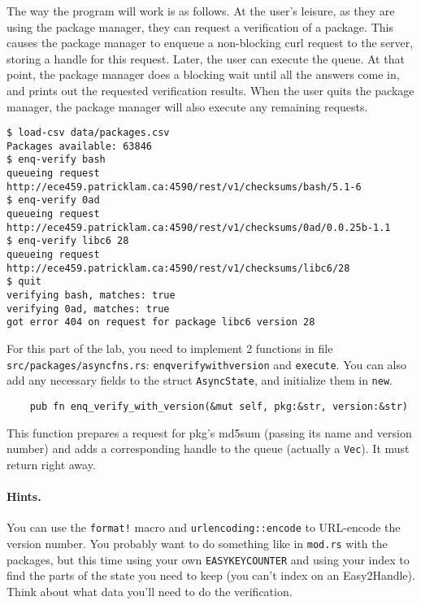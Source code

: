\documentclass[12pt]{article}
\renewcommand{\_}{\kern-1.5pt\textunderscore\kern-1.5pt}
\begin{document}
\vspace{1em}
The way the program will work is as follows. At the user's leisure, as they are using the package manager, they can request a verification of a package. This causes the package manager to enqueue a non-blocking curl request to the server, storing a handle for this request. Later, the user can execute the queue. At that point, the package manager does a blocking wait until all the answers come in, and prints out the requested verification results. When the user quits the package manager, the package manager will also execute any remaining requests.\par

\begin{verbatim}
$ load-csv data/packages.csv
Packages available: 63846
$ enq-verify bash
queueing request http://ece459.patricklam.ca:4590/rest/v1/checksums/bash/5.1-6
$ enq-verify 0ad
queueing request http://ece459.patricklam.ca:4590/rest/v1/checksums/0ad/0.0.25b-1.1
$ enq-verify libc6 28
queueing request http://ece459.patricklam.ca:4590/rest/v1/checksums/libc6/28
$ quit
verifying bash, matches: true
verifying 0ad, matches: true
got error 404 on request for package libc6 version 28
\end{verbatim}

\vspace{1em}
For this part of the lab, you need to implement 2 functions in file \texttt{src/packages/async\_fns.rs}: \texttt{enq\_verify\_with\_version} and \texttt{execute}. You can also add any necessary fields to the struct \texttt{AsyncState}, and initialize them in \texttt{new}.

\vspace{1em}
\begin{verbatim}
    pub fn enq_verify_with_version(&mut self, pkg:&str, version:&str)
\end{verbatim}
This function prepares a request for pkg's md5sum (passing its name and version number) and adds a
corresponding handle to the queue (actually a \texttt{Vec}). It must
return right away.

\paragraph{Hints.} You can use the \texttt{format!} macro and \texttt{urlencoding::encode} to URL-encode the version number. You probably want to do something like in \texttt{mod.rs} with the packages, but this time using your own \texttt{EASYKEY\_COUNTER} and using your index to find the parts of the state you need to keep (you can't index on an Easy2Handle). Think about what data you'll need to do the verification.
\end{document}

